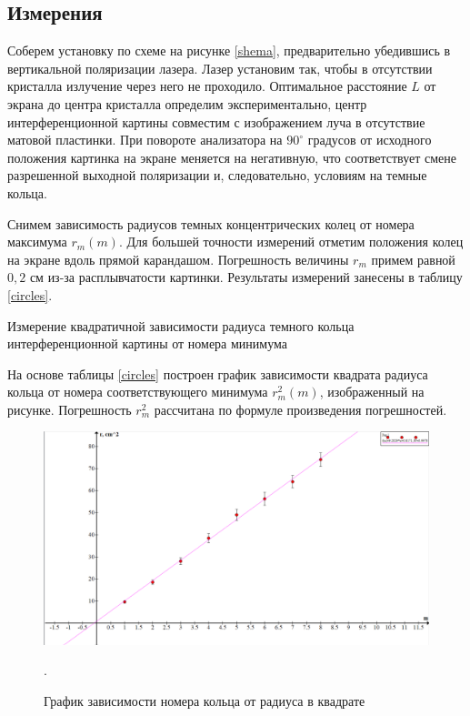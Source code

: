 \documentclass[15pt,a5paper,reqno]{article}
\begin{document}
	\subsection{Измерения}
	
	Соберем установку по схеме на рисунке \ref{shema}, предварительно убедившись в вертикальной поляризации лазера. Лазер установим так, чтобы в отсутствии кристалла излучение через него не проходило. Оптимальное расстояние $L$ от экрана до центра кристалла определим экспериментально, центр интерференционной картины совместим с изображением луча в отсутствие матовой пластинки. При повороте анализатора на $90^\circ$ градусов от исходного положения картинка на экране меняется на негативную, что соответствует смене разрешенной выходной поляризации и, следовательно, условиям на темные кольца. 
	
	Снимем зависимость радиусов темных концентрических колец от номера максимума $r_m(m)$. Для большей точности измерений отметим положения колец на экране вдоль прямой карандашом. Погрешность величины $r_m$ примем равной $0,2$ см из-за расплывчатости картинки. Результаты измерений занесены в таблицу \ref{circles}. 
	
	\begin{table}[h]
		\centering
		
		\caption{Измерение квадратичной зависимости радиуса темного кольца интерференционной картины от номера минимума}
		\label{circles}
	\end{table}	
	
	На основе таблицы \ref{circles} построен график зависимости квадрата радиуса кольца от номера соответствующего минимума $r_m^2(m)$, изображенный на рисунке. Погрешность $r_m^2$ рассчитана по формуле произведения погрешностей. 
	
  	\begin{figure}[h!]
  		\label{C_g}
  		\includegraphics[scale=0.35]{pics/graph.png}
  		\caption{График зависимости номера кольца от радиуса в квадрате}. 
  	\end{figure}
  	
\end{document}
